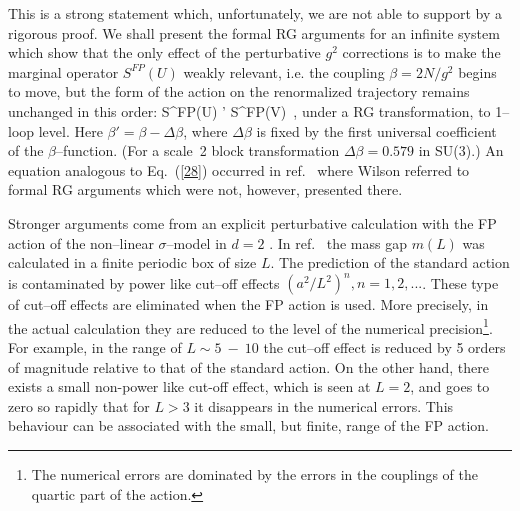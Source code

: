 This is a strong statement  which, unfortunately, we are not able
to support by a rigorous proof. 
We shall present the formal RG arguments for an infinite system
which show that the only effect of the perturbative $g^2$
corrections is to make the marginal operator $S^{FP}(U)$ weakly relevant,
i.e. the coupling $\beta=2 N/g^2$ begins to move, but the form
of the action on the renormalized trajectory remains
unchanged in this order:
\bee
\beta S^{FP}(U) \longrightarrow \beta' S^{FP}(V) \,,      \label{28}
\ee  
under a RG transformation, to 1--loop level. 
Here $\beta'=\beta -\Delta\beta$, where $\Delta\beta$ is fixed
by the first universal coefficient of the $\beta$--function.
(For a scale~2 block transformation $\Delta\beta=0.579$ in SU(3).)
An equation analogous to Eq.~(\ref{28}) occurred in ref.~\cite{WILSON}
where Wilson referred to formal RG arguments which were not, however, 
presented there.

Stronger arguments come from an explicit perturbative calculation with the 
FP action of the non--linear $\sigma$--model in $d=2$ \cite{AHNP}.
In ref.~\cite{AHNP} the mass gap $m(L)$ was calculated in a finite
periodic box of size $L$. 
The prediction of the standard action  is contaminated by power like
cut--off effects $(a^2/L^2)^n, n=1,2,...$. These type of cut--off
effects are eliminated when the FP action is used. More precisely,
in the actual calculation they are reduced to the level of the numerical
precision\footnote{The numerical errors are dominated by the errors
in the couplings of the quartic part of the action.}. For example, 
in the range of $L\sim 5~-~10$ the cut--off effect is reduced by 5
orders of magnitude relative to that of the standard action. On the
other hand, there exists a small non-power like cut-off effect, which
is seen at $L=2$, and goes to zero so rapidly that for $L>3$ it disappears
in the numerical errors. 
This behaviour can be associated with the small, but
finite, range of the FP action.

